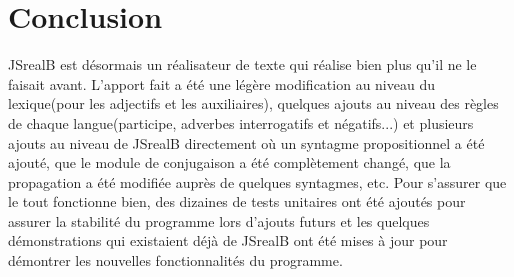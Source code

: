 \documentclass[11pt]{article} %
\newcommand{\system}[1]{\textsf{#1}}
\newcommand{\JSB}{\system{JSrealB}}
\begin{document}
\section{Conclusion}
\JSB{} est désormais un réalisateur de texte qui réalise bien plus
qu'il ne le faisait avant. L'apport fait a été une légère
modification au niveau du lexique(pour les adjectifs et les auxiliaires),
quelques ajouts au niveau des règles de chaque langue(participe, adverbes
interrogatifs et négatifs...) et plusieurs ajouts au niveau de \JSB{}
directement où un syntagme propositionnel a été ajouté, que le module
de conjugaison a été complètement changé, que la propagation a été
modifiée auprès de quelques syntagmes, etc. Pour s'assurer que le
tout fonctionne bien, des dizaines de tests unitaires ont été ajoutés pour assurer
la stabilité du programme lors d'ajouts futurs et les quelques démonstrations
qui existaient déjà de \JSB{} ont été mises à jour pour démontrer
les nouvelles fonctionnalités du programme.
\end{document}
